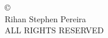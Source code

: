 \null
\vfill
\begin{flushleft}
\copyright{}\\
Rihan Stephen Pereira\\
ALL RIGHTS RESERVED
\end{flushleft}